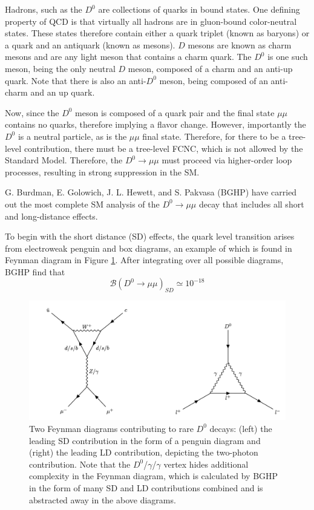 Hadrons, such as the $D^0$ are collections of quarks in bound states. One defining property of QCD is that virtually all hadrons are in gluon-bound color-neutral states. These states therefore contain either a quark triplet (known as baryons) or a quark and an antiquark (known as mesons). $D$ mesons are known as charm mesons and are any light meson that contains a charm quark. The $D^0$ is one such meson, being the only neutral $D$ meson, composed of a charm and an anti-up quark. Note that there is also an anti-$D^0$ meson, being composed of an anti-charm and an up quark. 

Now, since the $D^0$ meson is composed of a quark pair and the final state $\mu \mu$ contains no quarks, therefore implying a flavor change. However, importantly the $D^0$ is a neutral particle, as is the $\mu \mu$ final state. Therefore, for there to be a tree-level contribution, there must be a tree-level FCNC, which is not allowed by the Standard Model. Therefore, the $D^0 \to \mu \mu$  must proceed via higher-order loop processes, resulting in strong suppression in the SM.

G. Burdman, E. Golowich, J. L. Hewett, and S. Pakvasa (BGHP) have carried out the most complete SM analysis of the $D^0 \to \mu \mu$ decay that includes all short and long-distance effects. 

To begin with the short distance (SD) effects, the quark level transition arises from electroweak penguin and box diagrams, an example of which is found in Feynman diagram in Figure \ref{fig:D0_decay_diagrams}. After integrating over all possible diagrams, BGHP find that 
\begin{equation}
\mathcal{B}(D^0 \to \mu \mu)_{SD} \simeq 10^{-18}
\end{equation}

\begin{figure}[ht!]
    \centering
    \includegraphics[width=1.0\textwidth]{figures/chapter2/d0_FCNC_decays.png}
    \caption{Two Feynman diagrams contributing to rare \(D^0\) decays: (left) the leading SD contribution in the form of a penguin diagram and (right) the leading LD contribution, depicting the two-photon contribution. Note that the $D^0$/$\gamma$/$\gamma$ vertex hides additional complexity in the Feynman diagram, which is calculated by BGHP in the form of many SD and LD contributions combined and is abstracted away in the above diagrams.}
  \label{fig:D0_decay_diagrams}
\end{figure}


